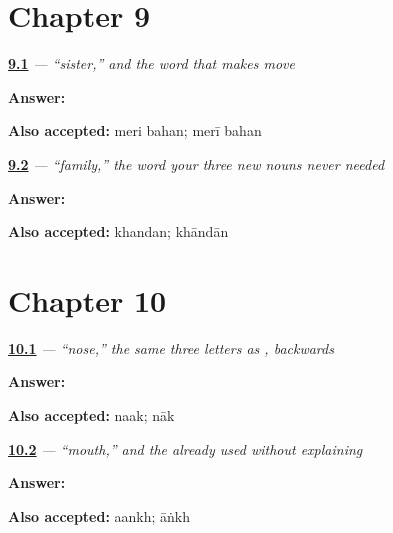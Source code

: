 \section*{Chapter 9}

\noindent\begin{minipage}[t]{\linewidth}
\raggedright
\hyperlink{review-UR-C09-bahan-agreement}{\textbf{9.1}} \emph{ — \textquotedblleft{}sister,\textquotedblright{} and the word that makes  move}\par
\small \textbf{Answer:}  \par
\footnotesize \textbf{Also accepted:} meri bahan; merī bahan
\end{minipage}\par\medskip

\noindent\begin{minipage}[t]{\linewidth}
\raggedright
\hyperlink{review-UR-C09-khandan-sort}{\textbf{9.2}} \emph{ — \textquotedblleft{}family,\textquotedblright{} the word your three new nouns never needed}\par
\small \textbf{Answer:} \par
\footnotesize \textbf{Also accepted:} khandan; khāndān
\end{minipage}\par\medskip

\section*{Chapter 10}

\noindent\begin{minipage}[t]{\linewidth}
\raggedright
\hyperlink{review-UR-C10-naak-reversal}{\textbf{10.1}} \emph{ — \textquotedblleft{}nose,\textquotedblright{} the same three letters as , backwards}\par
\small \textbf{Answer:} \par
\footnotesize \textbf{Also accepted:} naak; nāk
\end{minipage}\par\medskip

\noindent\begin{minipage}[t]{\linewidth}
\raggedright
\hyperlink{review-UR-C10-munh-nun}{\textbf{10.2}} \emph{ — \textquotedblleft{}mouth,\textquotedblright{} and the   already used without explaining}\par
\small \textbf{Answer:} \par
\footnotesize \textbf{Also accepted:} aankh; āṅkh
\end{minipage}\par\medskip

